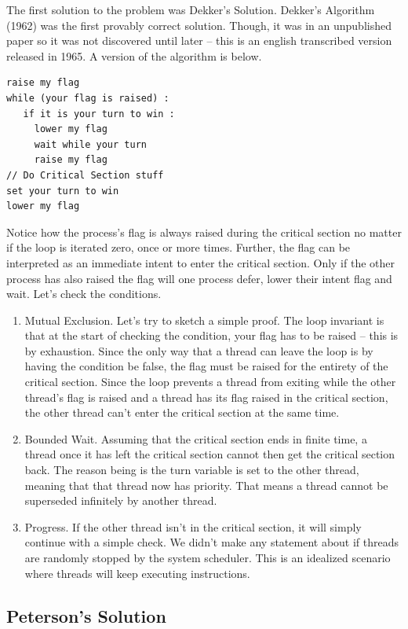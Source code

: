 The first solution to the problem was Dekker's Solution.
Dekker's Algorithm (1962) was the first provably correct solution.
Though, it was in an unpublished paper so it was not discovered until later \cite{dekker_dijkstra_1965} -- this is an english transcribed version released in 1965.
A version of the algorithm is below.

\begin{lstlisting}
raise my flag
while (your flag is raised) :
   if it is your turn to win :
     lower my flag
     wait while your turn
     raise my flag
// Do Critical Section stuff
set your turn to win
lower my flag
\end{lstlisting}

Notice how the process's flag is always raised during the critical section no matter if the loop is iterated zero, once or more times.
Further, the flag can be interpreted as an immediate intent to enter the critical section.
Only if the other process has also raised the flag will one process defer, lower their intent flag and wait.
Let's check the conditions.

\begin{enumerate}
\item Mutual Exclusion. Let's try to sketch a simple proof.
  The loop invariant is that at the start of checking the condition, your flag has to be raised -- this is by exhaustion.
  Since the only way that a thread can leave the loop is by having the condition be false, the flag must be raised for the entirety of the critical section.
  Since the loop prevents a thread from exiting while the other thread's flag is raised and a thread has its flag raised in the critical section, the other thread can't enter the critical section at the same time.
\item Bounded Wait.
  Assuming that the critical section ends in finite time, a thread once it has left the critical section cannot then get the critical section back.
  The reason being is the turn variable is set to the other thread, meaning that that thread now has priority.
  That means a thread cannot be superseded infinitely by another thread.
\item Progress.  If the other thread isn't in the critical section, it will simply continue with a simple check. We didn't make any statement about if threads are randomly stopped by the system scheduler.
  This is an idealized scenario where threads will keep executing instructions.
\end{enumerate}

\subsection{Peterson's Solution}

